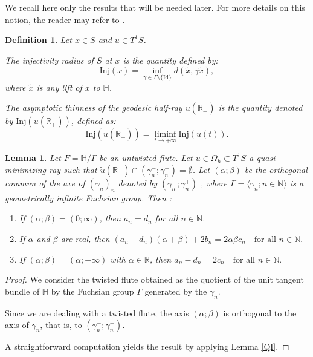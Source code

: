 \documentclass[11pt]{amsart}
\newtheorem{lem}{Lemma}[section]
\newtheorem{dfn}[thm]{Definition}
\begin{document}
We recall here only the results that will be needed later. For more details on this notion, the reader may refer to \cite{SyGaye2025}.

\begin{dfn}
Let \( x \in S \) and \( u \in T^1S \).

The injectivity radius of \( S \) at \( x \) is the quantity defined by:
\[
\mathrm{Inj}(x) = \inf_{\gamma \in \Gamma \setminus \{ \mathrm{Id} \}} d(\widetilde{x}, \gamma \widetilde{x}),
\]
where \( \widetilde{x} \) is any lift of \( x \) to \( \mathbb{H} \).

The \emph{asymptotic thinness} of the geodesic half-ray \( u(\mathbb{R}_{+}) \) is the quantity denoted by \( \mathrm{Inj}(u(\mathbb{R}_{+})) \), defined as:
\[
\mathrm{Inj}(u(\mathbb{R}_{+})) = \liminf_{t \to +\infty} \mathrm{Inj}(u(t)).
\]
\end{dfn}
\newpage
\begin{lem}\label{T}
Let $F = \mathbb{H}/\Gamma$ be an untwisted flute. Let $u\in\Omega_{h}\subset T^{1}S$ a quasi-minimizing ray such that $\tilde{u}(\mathbb{R^{+}})\cap(\gamma_{n}^{-};\gamma_{n}^{+})=\emptyset$. Let $(\alpha; \beta)$ be the orthogonal commun of the axe of $(\gamma_{n})_{n}$ denoted by $(\gamma_{n}^{-};\gamma_{n}^{+})$ , where $\Gamma = \langle \gamma_n;n\in\mathbb{N} \rangle $ is a geometrically infinite Fuchsian group. Then :
\begin{enumerate}
    \item If \( (\alpha; \beta) = (0; \infty) \), then \( a_n = d_n \) for all \( n \in \mathbb{N} \).
    
    \item If \( \alpha \) and \( \beta \) are real, then
    $
    (a_n - d_n)(\alpha + \beta) + 2b_n = 2\alpha \beta c_n \quad \text{for all } n \in \mathbb{N}.
    $
    
    \item If \( (\alpha; \beta) = (\alpha; +\infty) \) with \( \alpha \in \mathbb{R} \), then
    $
    a_n - d_n = 2c_n \quad \text{for all } n \in \mathbb{N}.
    $
\end{enumerate}
\end{lem}

\begin{proof}
We consider the twisted flute obtained as the quotient of the unit tangent bundle of \( \mathbb{H} \) by the Fuchsian group \( \Gamma \) generated by the \( \gamma_n \).

Since we are dealing with a twisted flute, the axis \( (\alpha; \beta) \) is orthogonal to the axis of \( \gamma_n \), that is, to \( (\gamma_n^{-}; \gamma_n^{+}) \).

A straightforward computation yields the result by applying Lemma \ref{QI}.
\end{proof}
\end{document}
